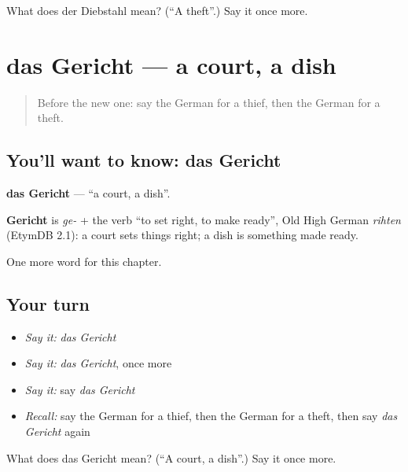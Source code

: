 \begin{tcolorbox}[breakable,colback=teal!4,colframe=teal!35!black,title={Before you move on}]
What does der Diebstahl mean? (\textquotedblleft{}A theft\textquotedblright{}.) Say it once more.
\end{tcolorbox}
\section[das Gericht]{das Gericht — a court, a dish}

\label{lesson:GE-C207-gericht}



\begin{quote}
Before the new one: say the German for a thief, then the German for a theft.
\end{quote}

\subsection*{You'll want to know: das Gericht}
\textbf{das Gericht} — \textquotedblleft{}a court, a dish\textquotedblright{}.

\begin{cousinweb}
\textbf{Gericht} is \emph{ge-} + the verb \textquotedblleft{}to set right, to make ready\textquotedblright{}, Old High German \emph{rihten} (EtymDB 2.1): a court sets things right; a dish is something made ready.
\end{cousinweb}

\begin{grammarlens}[title={What you've built}]
One more word for this chapter.
\end{grammarlens}

\subsection*{Your turn}
\begin{itemize}
\raggedright
  \item \emph{Say it:} \emph{das Gericht}
  \item \emph{Say it:} \emph{das Gericht}, once more
  \item \emph{Say it:} say \emph{das Gericht}
  \item \emph{Recall:} say the German for a thief, then the German for a theft, then say \emph{das Gericht} again
\end{itemize}

\begin{tcolorbox}[breakable,colback=teal!4,colframe=teal!35!black,title={Before you move on}]
What does das Gericht mean? (\textquotedblleft{}A court, a dish\textquotedblright{}.) Say it once more.
\end{tcolorbox}
